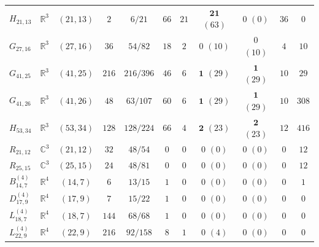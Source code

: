 \documentclass[aps,pra,reprint,superscriptaddress,longbibliography,nofootinbib,floatfix,10pt]{revtex4-2}
\theoremstyle{definition}\newtheorem{definition}[theorem]{Definition}
\theoremstyle{remark}\newtheorem{remark}[theorem]{Remark}
\newcommand{\C}{\mathbb C}\newcommand{\R}{\mathbb R}\newcommand{\Q}{\mathbb Q}
\begin{document}
\begin{table}[!htbp]
\begin{ruledtabular}
\begin{tabular}{llccccccccc}
$H_{21,13}$ & $\R^3$ & $(21,13)$ & $2$ & $6/21$ & $66$ & $21$ & $\mathbf{21}$ $(63)$ & $0$ $(0)$ & $36$ & $0$\\
$G_{27,16}$ & $\R^3$ & $(27,16)$ & $36$ & $54/82$ & $18$ & $2$ & $0$ $(10)$ & $0$ $(10)$ & $4$ & $10$\\
$G_{41,25}$ & $\R^3$ & $(41,25)$ & $216$ & $216/396$ & $46$ & $6$ & $\mathbf{1}$ $(29)$ & $\mathbf{1}$ $(29)$ & $10$ & $29$\\
$G_{41,26}$ & $\R^3$ & $(41,26)$ & $48$ & $63/107$ & $60$ & $6$ & $\mathbf{1}$ $(29)$ & $\mathbf{1}$ $(29)$ & $10$ & $308$\\
$H_{53,34}$ & $\R^3$ & $(53,34)$ & $128$ & $128/224$ & $66$ & $4$ & $\mathbf{2}$ $(23)$ & $\mathbf{2}$ $(23)$ & $12$ & $416$\\
$R_{21,12}$ & $\C^3$ & $(21,12)$ & $32$ & $48/54$ & $0$ & $0$ & $0$ $(0)$ & $0$ $(0)$ & $0$ & $12$\\
$R_{25,15}$ & $\C^3$ & $(25,15)$ & $24$ & $48/81$ & $0$ & $0$ & $0$ $(0)$ & $0$ $(0)$ & $0$ & $12$\\\hline
$B_{14,7}^{(4)}$ & $\R^4$ & $(14,7)$ & $6$ & $13/15$ & $1$ & $0$ & $0$ $(0)$ & $0$ $(0)$ & $0$ & $1$\\
$D_{17,9}^{(4)}$ & $\R^4$ & $(17,9)$ & $7$ & $15/22$ & $1$ & $0$ & $0$ $(0)$ & $0$ $(0)$ & $0$ & $0$\\
$L_{18,7}^{(4)}$ & $\R^4$ & $(18,7)$ & $144$ & $68/68$ & $1$ & $0$ & $0$ $(0)$ & $0$ $(0)$ & $0$ & $0$\\
$L_{22,9}^{(4)}$ & $\R^4$ & $(22,9)$ & $216$ & $92/158$ & $8$ & $1$ & $0$ $(4)$ & $0$ $(0)$ & $0$ & $0$\\
\end{tabular}
\end{ruledtabular}
\end{table}
\end{document}
